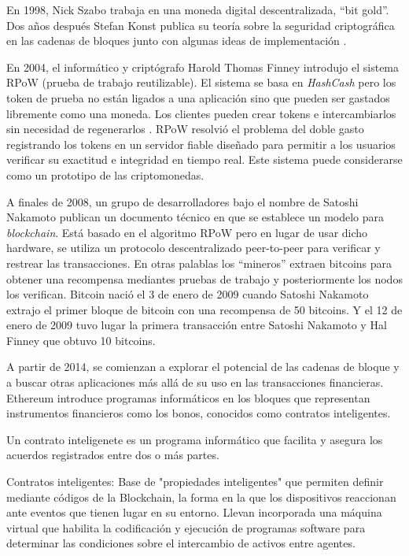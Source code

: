 En 1998, Nick Szabo trabaja en una moneda digital descentralizada, ``bit gold''. Dos años después Stefan Konst publica su teoría sobre la seguridad criptográfica en las cadenas de bloques junto con algunas ideas de implementación \cite{historia2-block}.

En 2004, el informático y criptógrafo Harold Thomas Finney introdujo el sistema RPoW (prueba de trabajo reutilizable). El sistema se basa en \textit{HashCash} pero los token de prueba no están ligados a una aplicación sino que pueden ser gastados libremente como una moneda. Los clientes pueden crear tokens e intercambiarlos sin necesidad de regenerarlos \cite{RPoW}. RPoW resolvió el problema del doble gasto registrando los tokens en un servidor fiable diseñado para permitir a los usuarios verificar su exactitud e integridad en tiempo real. Este sistema puede considerarse como un prototipo de las criptomonedas.

A finales de 2008, un grupo de desarrolladores bajo el nombre de Satoshi Nakamoto publican un documento técnico en que se establece un modelo para \textit{blockchain}. Está basado en el algoritmo RPoW pero en lugar de usar dicho hardware, se utiliza un protocolo descentralizado peer-to-peer para verificar y restrear las transacciones. En otras palablas los ``mineros'' extraen bitcoins para obtener una recompensa mediantes pruebas de trabajo y posteriormente los nodos los verifican. Bitcoin nació el 3 de enero de 2009 cuando Satoshi Nakamoto extrajo el primer bloque de bitcoin con una recompensa de 50 bitcoins. Y el 12 de enero de 2009 tuvo lugar la primera transacción entre Satoshi Nakamoto y Hal Finney que obtuvo 10 bitcoins.

A partir de 2014, se comienzan a explorar el potencial de las cadenas de bloque y a buscar otras aplicaciones más allá de su uso en las transacciones financieras.
Ethereum introduce programas informáticos en los bloques que representan instrumentos financieros como los bonos, conocidos como contratos inteligentes.

Un contrato inteligenete es un programa informático que facilita y asegura los acuerdos registrados entre dos o más partes\cite{contrato-inteligente}.

 Contratos inteligentes: Base de "propiedades inteligentes" que permiten definir mediante códigos de la Blockchain, la forma en la que los dispositivos reaccionan ante eventos que tienen lugar en su entorno. Llevan incorporada una máquina virtual que habilita la codificación y ejecución de programas software para determinar las condiciones sobre el intercambio de activos entre agentes.


